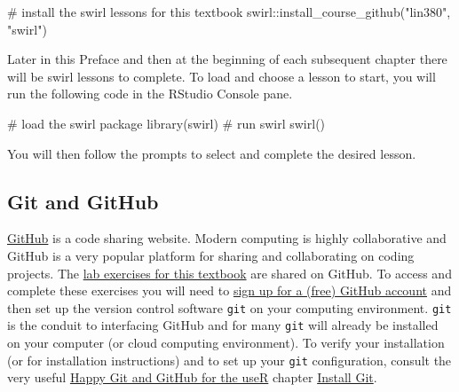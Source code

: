 \documentclass[
  letterpaper,
]{latex/krantz}
\newenvironment{Shaded}{\begin{snugshade}}{\end{snugshade}}
\newcommand{\CommentTok}[1]{\textcolor[rgb]{0.37,0.37,0.37}{#1}}
\newcommand{\FunctionTok}[1]{\textcolor[rgb]{0.28,0.35,0.67}{#1}}
\newcommand{\NormalTok}[1]{\textcolor[rgb]{0.00,0.23,0.31}{#1}}
\newcommand{\SpecialCharTok}[1]{\textcolor[rgb]{0.37,0.37,0.37}{#1}}
\newcommand{\StringTok}[1]{\textcolor[rgb]{0.13,0.47,0.30}{#1}}
\begin{document}
\begin{Shaded}
\begin{Highlighting}[]
\CommentTok{\# install the swirl lessons for this textbook}
\NormalTok{swirl}\SpecialCharTok{::}\FunctionTok{install\_course\_github}\NormalTok{(}\StringTok{"lin380"}\NormalTok{, }\StringTok{"swirl"}\NormalTok{)}
\end{Highlighting}
\end{Shaded}

Later in this Preface and then at the beginning of each subsequent
chapter there will be swirl lessons to complete. To load and choose a
lesson to start, you will run the following code in the RStudio Console
pane.

\begin{Shaded}
\begin{Highlighting}[]
\CommentTok{\# load the swirl package}
\FunctionTok{library}\NormalTok{(swirl) }
\CommentTok{\# run swirl}
\FunctionTok{swirl}\NormalTok{()}
\end{Highlighting}
\end{Shaded}

You will then follow the prompts to select and complete the desired
lesson.

\hypertarget{git-and-github}{%
\subsection*{Git and GitHub}\label{git-and-github}}

\href{https://github.com/}{GitHub} is a code sharing website. Modern
computing is highly collaborative and GitHub is a very popular platform
for sharing and collaborating on coding projects. The
\href{https://github.com/stars/francojc/lists/labs}{lab exercises for
this textbook} are shared on GitHub. To access and complete these
exercises you will need to
\href{https://github.com/signup?ref_cta=Sign+up\&ref_loc=header+logged+out\&ref_page=\%2F\&source=header-home}{sign
up for a (free) GitHub account} and then set up the version control
software \texttt{git} on your computing environment. \texttt{git} is the
conduit to interfacing GitHub and for many \texttt{git} will already be
installed on your computer (or cloud computing environment). To verify
your installation (or for installation instructions) and to set up your
\texttt{git} configuration, consult the very useful
\href{https://happygitwithr.com/}{Happy Git and GitHub for the useR}
chapter \href{https://happygitwithr.com/install-git.html}{Install Git}.
\end{document}
